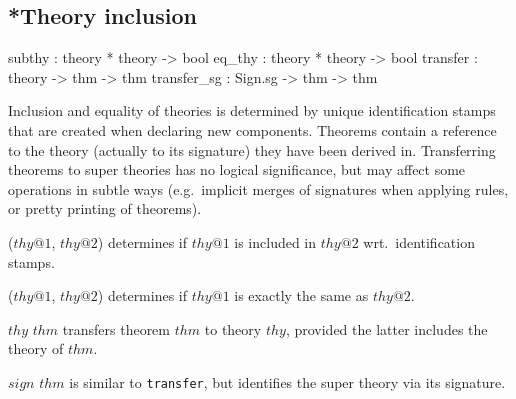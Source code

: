 \subsection{*Theory inclusion}
\begin{ttbox}
subthy      : theory * theory -> bool
eq_thy      : theory * theory -> bool
transfer    : theory -> thm -> thm
transfer_sg : Sign.sg -> thm -> thm
\end{ttbox}

Inclusion and equality of theories is determined by unique
identification stamps that are created when declaring new components.
Theorems contain a reference to the theory (actually to its signature)
they have been derived in.  Transferring theorems to super theories
has no logical significance, but may affect some operations in subtle
ways (e.g.\ implicit merges of signatures when applying rules, or
pretty printing of theorems).

\begin{ttdescription}

\item[\ttindexbold{subthy} ($thy@1$, $thy@2$)] determines if $thy@1$
  is included in $thy@2$ wrt.\ identification stamps.

\item[\ttindexbold{eq_thy} ($thy@1$, $thy@2$)] determines if $thy@1$
  is exactly the same as $thy@2$.

\item[\ttindexbold{transfer} $thy$ $thm$] transfers theorem $thm$ to
  theory $thy$, provided the latter includes the theory of $thm$.
  
\item[\ttindexbold{transfer_sg} $sign$ $thm$] is similar to
  \texttt{transfer}, but identifies the super theory via its
  signature.

\end{ttdescription}


